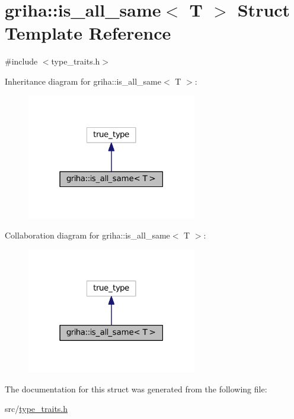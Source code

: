 \hypertarget{structgriha_1_1is__all__same_3_01_t_01_4}{}\section{griha\+:\+:is\+\_\+all\+\_\+same$<$ T $>$ Struct Template Reference}
\label{structgriha_1_1is__all__same_3_01_t_01_4}


{\ttfamily \#include $<$type\+\_\+traits.\+h$>$}



Inheritance diagram for griha\+:\+:is\+\_\+all\+\_\+same$<$ T $>$\+:
\nopagebreak
\begin{figure}[H]
\begin{center}
\leavevmode
\includegraphics[width=210pt]{structgriha_1_1is__all__same_3_01_t_01_4__inherit__graph}
\end{center}
\end{figure}


Collaboration diagram for griha\+:\+:is\+\_\+all\+\_\+same$<$ T $>$\+:
\nopagebreak
\begin{figure}[H]
\begin{center}
\leavevmode
\includegraphics[width=210pt]{structgriha_1_1is__all__same_3_01_t_01_4__coll__graph}
\end{center}
\end{figure}


The documentation for this struct was generated from the following file\+:\begin{DoxyCompactItemize}
\item 
src/\hyperlink{type__traits_8h}{type\+\_\+traits.\+h}\end{DoxyCompactItemize}
